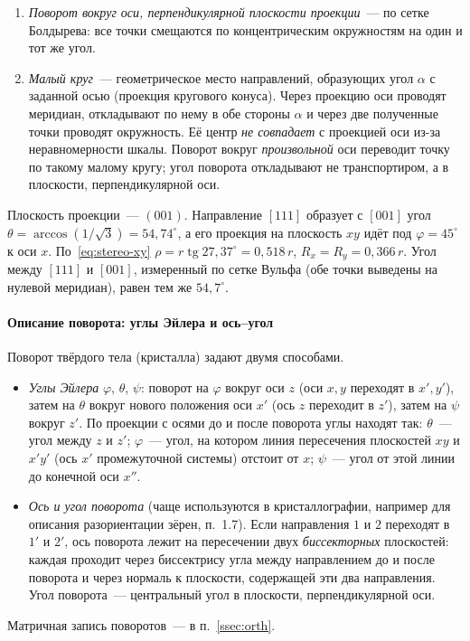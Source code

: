 \begin{enumerate}
поворачивают через её полюс: поворачивают полюс, затем строят новую дугу.
\item \emph{Поворот вокруг оси, перпендикулярной плоскости проекции}~—
по сетке Болдырева: все точки смещаются по концентрическим окружностям на
один и тот же угол.
\item \emph{Малый круг}~— геометрическое место направлений, образующих угол
$\alpha$ с заданной осью (проекция кругового конуса). Через проекцию оси
проводят меридиан, откладывают по нему в обе стороны $\alpha$ и через две
полученные точки проводят окружность. Её центр \emph{не совпадает} с
проекцией оси из-за неравномерности шкалы. Поворот вокруг \emph{произвольной}
оси переводит точку по такому малому кругу; угол поворота откладывают не
транспортиром, а в плоскости, перпендикулярной оси.
\end{enumerate}

\begin{primer}
Плоскость проекции~— $(001)$. Направление $[111]$ образует с $[001]$ угол
$\theta=\arccos(1/\sqrt3)=54{,}74^\circ$, а его проекция на плоскость $xy$
идёт под $\varphi=45^\circ$ к оси $x$. По~\eqref{eq:stereo-xy}
$\rho=r\operatorname{tg}27{,}37^\circ=0{,}518\,r$, $R_x=R_y=0{,}366\,r$. Угол между
$[111]$ и $[001]$, измеренный по сетке Вульфа (обе точки выведены на
нулевой меридиан), равен тем же $54{,}7^\circ$.
\end{primer}

\paragraph{Описание поворота: углы Эйлера и ось--угол}
Поворот твёрдого тела (кристалла) задают двумя способами.
\begin{itemize}
\item \emph{Углы Эйлера} $\varphi$, $\theta$, $\psi$: поворот на $\varphi$ вокруг
оси $z$ (оси $x,y$ переходят в $x',y'$), затем на $\theta$ вокруг нового
положения оси $x'$ (ось $z$ переходит в $z'$), затем на $\psi$ вокруг $z'$.
По проекции с осями до и после поворота углы находят так: $\theta$~— угол
между $z$ и $z'$; $\varphi$~— угол, на котором линия пересечения плоскостей
$xy$ и $x'y'$ (ось $x'$ промежуточной системы) отстоит от $x$; $\psi$~— угол
от этой линии до конечной оси $x''$.
\item \emph{Ось и угол поворота} (чаще используются в кристаллографии,
например для описания разориентации зёрен, п.~1.7). Если направления $1$
и $2$ переходят в $1'$ и $2'$, ось поворота лежит на пересечении двух
\emph{биссекторных} плоскостей: каждая проходит через биссектрису угла
между направлением до и после поворота и через нормаль к плоскости,
содержащей эти два направления. Угол поворота~— центральный угол в
плоскости, перпендикулярной оси.
\end{itemize}
Матричная запись поворотов~— в п.~\ref{ssec:orth}.
